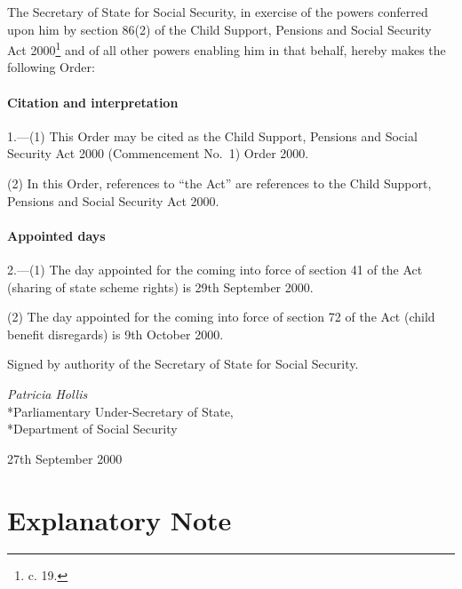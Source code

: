 \documentclass[12pt,a4paper]{article}
\title{\regstitle}
\author{S.I. 2000 No. 2666 (C.74)}
\date{Made 27th September 2000}
\begin{document}
\maketitle

\noindent
The Secretary of State for Social Security, in exercise of the powers conferred upon him by section 86(2) of the Child Support, Pensions and Social Security Act 2000\footnote{ c. 19.} and of all other powers enabling him in that behalf, hereby makes the following Order: 

{\sloppy

\tableofcontents

}

\bigskip

\setcounter{secnumdepth}{-2}

\subsection[1. Citation and interpretation]{Citation and interpretation}

1.---(1)  This Order may be cited as the Child Support, Pensions and Social Security Act 2000 (Commencement No.\ 1) Order 2000.

(2) In this Order, references to “the Act” are references to the Child Support, Pensions and Social Security Act 2000.

\subsection[2. Appointed days]{Appointed days}

2.---(1)  The day appointed for the coming into force of section 41 of the Act (sharing of state scheme rights) is 29th September 2000.

(2) The day appointed for the coming into force of section 72 of the Act (child benefit disregards) is 9th October 2000. 

\bigskip

Signed 
by authority of the Secretary of State for Social Security.

{\raggedleft
\emph{Patricia Hollis}\\*Parliamentary Under-Secretary of State,\\*Department of Social Security

}

27th September 2000

\small

\part{Explanatory Note}
\end{document}
